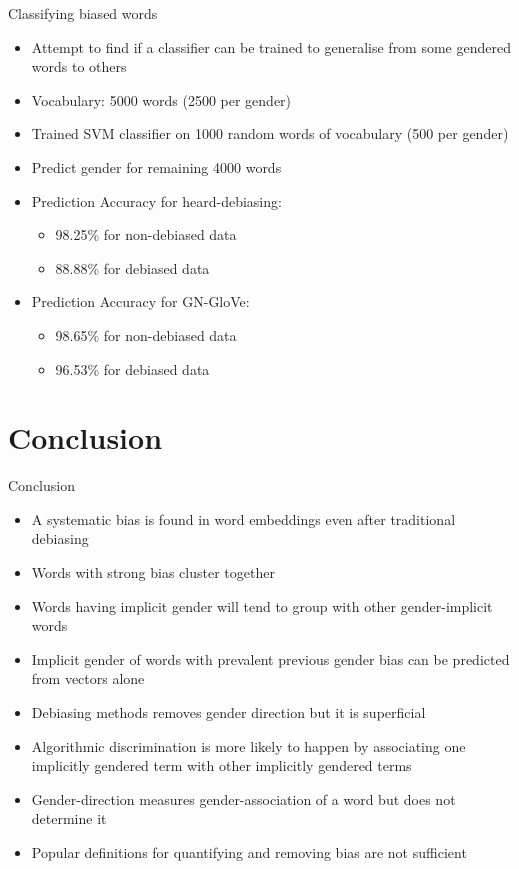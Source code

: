 \documentclass{beamer}
\begin{document}
	\begin{frame}{Classifying biased words}
		\begin{itemize}
			\item Attempt to find if a classifier can be trained to generalise from some gendered words to others
			\item Vocabulary: 5000 words (2500 per gender)
			\item Trained SVM classifier on 1000 random words of vocabulary (500 per gender)
			\item Predict gender for remaining 4000 words
			\item Prediction Accuracy for heard-debiasing:
			\begin{itemize}
				\item 98.25\% for non-debiased data
				\item 88.88\% for debiased data
			\end{itemize}
			\item Prediction Accuracy for GN-GloVe:
			\begin{itemize}
				\item 98.65\% for non-debiased data
				\item 96.53\% for debiased data
			\end{itemize}
			
		\end{itemize}
	\end{frame}


\section{Conclusion}
	\begin{frame}[allowframebreaks]{Conclusion}
		\begin{itemize}
			\item A systematic bias is found in word embeddings even after traditional debiasing
			\item Words with strong bias cluster together
			\item Words having implicit gender will tend to group with other gender-implicit words
			\item Implicit gender of words with prevalent previous gender bias can be predicted from vectors alone
			\item Debiasing methods removes gender direction but it is superficial
			\item  Algorithmic discrimination is more likely to happen by associating one implicitly gendered term with other implicitly gendered terms
			\item Gender-direction measures gender-association of a word but does not determine it
			\item Popular definitions for quantifying and removing bias are not sufficient
		\end{itemize}
	\end{frame}
\end{document}
